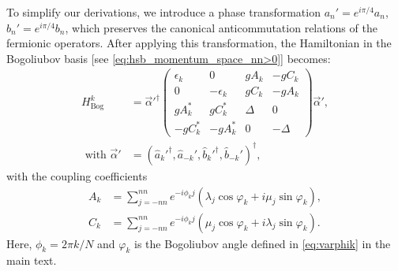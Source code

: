 To simplify our derivations, we introduce a phase transformation $a_n'= e^{i\pi/4}a_n$, $b_n'= e^{i\pi/4}b_n$, which preserves the canonical anticommutation relations of the fermionic operators. After applying this transformation, the Hamiltonian in the Bogoliubov basis [see \cref{eq:hsb_momentum_space_nn>0}] becomes:
\begin{align}
    H_{\text{Bog}}^k &= \vec{\alpha}'^\dag
    \begin{pmatrix}
        \epsilon_k &0           &gA_k   &-gC_k\\
        0          &-\epsilon_k &gC_k   &-gA_k\\
        gA^*_k     &gC^*_k      &\Delta &0\\
        -gC^*_k    &-gA^*_k     &0      &-\Delta
    \end{pmatrix}
    \vec{\alpha}',\\ \mbox{ with }
    \vec{\alpha}'    &=(\hat{a}_k'^{\dag},\hat{a}_{-k}',\hat{b}_k'^{\dag},\hat{b}_{-k}')^\dag,
    \label{eq:H_bogoliubov_appendix}
\end{align}
with the coupling coefficients
\begin{align}
    A_k &= \sum_{j=-nn}^{nn} e^{-i\phi_k j}(\lambda_j\cos\varphi_k+i\mu_j\sin\varphi_k),\\
    C_k &= \sum_{j=-nn}^{nn}e^{-i\phi_k j}(\mu_j\cos\varphi_k+i\lambda_j\sin\varphi_k).
\end{align}
Here, $\phi_k = 2\pi k/N$ and $\varphi_k$ is the Bogoliubov angle defined in \cref{eq:varphik} in the main text.

